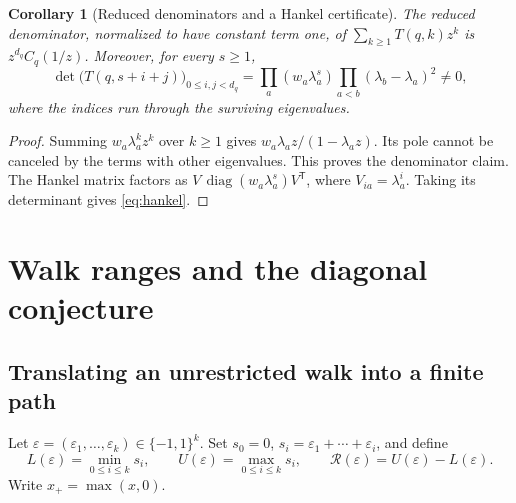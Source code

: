 \documentclass[11pt,letterpaper]{article}
\numberwithin{equation}{section}
\newtheorem{corollary}[theorem]{Corollary}
\theoremstyle{definition}
\begin{document}
\begin{corollary}[Reduced denominators and a Hankel certificate]\label{cor:hankel}
The reduced denominator, normalized to have constant term one, of
$\sum_{k\ge1}T(q,k)z^k$ is $z^{d_q}C_q(1/z)$.
Moreover, for every $s\ge1$,
\begin{equation}\label{eq:hankel}
\det\bigl(T(q,s+i+j)\bigr)_{0\le i,j<d_q}
=\prod_a(w_a\lambda_a^s)\prod_{a<b}(\lambda_b-\lambda_a)^2\ne0,
\end{equation}
where the indices run through the surviving eigenvalues.
\end{corollary}
\begin{proof}
Summing $w_a\lambda_a^kz^k$ over $k\ge1$ gives
$w_a\lambda_a z/(1-\lambda_a z)$.  Its pole cannot be canceled by the
terms with other eigenvalues.  This proves the denominator claim.
The Hankel matrix factors as
$V\,\operatorname{diag}(w_a\lambda_a^s)V^{\mathsf T}$, where
$V_{ia}=\lambda_a^i$.  Taking its determinant gives \eqref{eq:hankel}.
\end{proof}

\section{Walk ranges and the diagonal conjecture}
\label{sec:range}

\subsection{Translating an unrestricted walk into a finite path}
Let $\varepsilon=(\varepsilon_1,\ldots,\varepsilon_k)\in\{-1,1\}^k$.
Set $s_0=0$, $s_i=\varepsilon_1+\cdots+\varepsilon_i$, and define
\[
L(\varepsilon)=\min_{0\le i\le k}s_i,\qquad
U(\varepsilon)=\max_{0\le i\le k}s_i,\qquad
\mathcal R(\varepsilon)=U(\varepsilon)-L(\varepsilon).
\]
Write $x_+=\max(x,0)$.
\end{document}
